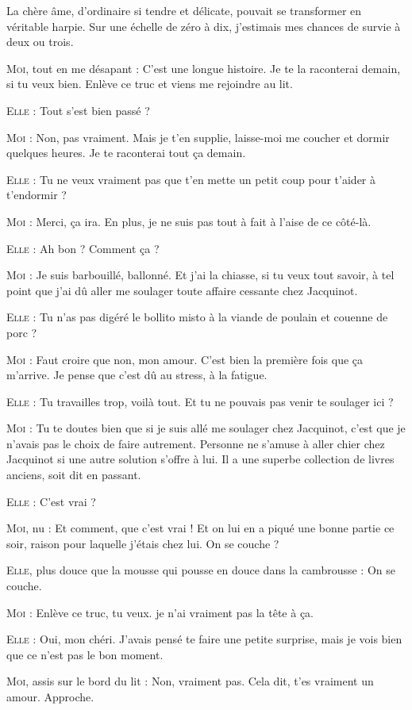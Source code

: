 La chère âme, d’ordinaire si tendre et délicate, pouvait se transformer en véritable harpie. Sur une échelle de zéro à dix, j’estimais mes chances de survie à deux ou trois.

\begin{dialogue}
    
\textsc{Moi}, tout en me désapant : C’est une longue histoire. Je te la raconterai demain, si tu veux bien. Enlève ce truc et viens me rejoindre au lit.

\textsc{Elle} : Tout s’est bien passé ?

\textsc{Moi} : Non, pas vraiment. Mais je t’en supplie, laisse-moi me coucher et dormir quelques heures. Je te raconterai tout ça demain.

\textsc{Elle} : Tu ne veux vraiment pas que t’en mette un petit coup pour t’aider à t’endormir ?

\textsc{Moi} : Merci, ça ira. En plus, je ne suis pas tout à fait à l’aise de ce côté-là.

\textsc{Elle} : Ah bon ? Comment ça ?

\textsc{Moi} : Je suis barbouillé, ballonné. Et j’ai la chiasse, si tu veux tout savoir, à tel point que j’ai dû aller me soulager toute affaire cessante chez Jacquinot.

\textsc{Elle} : Tu n’as pas digéré le bollito misto à la viande de poulain et couenne de porc ?

\textsc{Moi} : Faut croire que non, mon amour. C’est bien la première fois que ça m’arrive. Je pense que c’est dû au stress, à la fatigue.

\textsc{Elle} : Tu travailles trop, voilà tout. Et tu ne pouvais pas venir te soulager ici ?

\textsc{Moi} : Tu te doutes bien que si je suis allé me soulager chez Jacquinot, c’est que je n’avais pas le choix de faire autrement. Personne ne s’amuse à aller chier chez Jacquinot si une autre solution s’offre à lui. Il a une superbe collection de livres anciens, soit dit en passant.

\textsc{Elle} : C’est vrai ?

\textsc{Moi}, nu : Et comment, que c’est vrai ! Et on lui en a piqué une bonne partie ce soir, raison pour laquelle j’étais chez lui. On se couche ?

\textsc{Elle}, plus douce que la mousse qui pousse en douce dans la cambrousse : On se couche.

\textsc{Moi} : Enlève ce truc, tu veux. je n’ai vraiment pas la tête à ça.

\textsc{Elle} : Oui, mon chéri. J’avais pensé te faire une petite surprise, mais je vois bien que ce n’est pas le bon moment.

\textsc{Moi}, assis sur le bord du lit : Non, vraiment pas. Cela dit, t’es vraiment un amour. Approche.

\end{dialogue}
    
